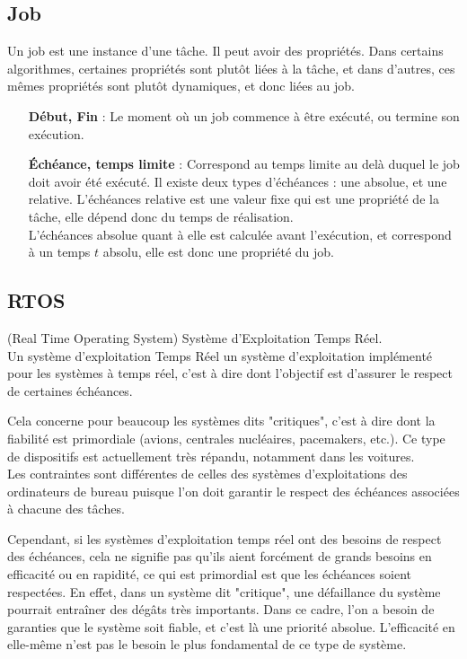 \documentclass[11pt,a4paper,oneside]{report}
\begin{document}
\subsection{Job}
Un job est une instance d'une tâche. 
Il peut avoir des propriétés. 
Dans certains algorithmes, certaines propriétés sont plutôt liées à la tâche, 
et dans d'autres, ces mêmes propriétés sont plutôt dynamiques, et donc liées au job.
\begin{itemize}
	\item[\textbf{Début, Fin}] : Le moment où un job commence à être exécuté, ou termine son exécution.
    \item[\textbf{Échéance, temps limite}] : Correspond au temps limite au delà duquel le job doit avoir été exécuté. Il existe deux types d'échéances : 
une absolue, et une relative. L'échéances relative est une valeur fixe qui 
est une propriété de la tâche, elle dépend donc du temps de réalisation.\\
L'échéances absolue quant à elle est calculée avant l'exécution, et correspond 
à un temps $t$ absolu, elle est donc une propriété du job.
\end{itemize}

\subsection{RTOS}
(Real Time Operating System) Système d'Exploitation Temps Réel.\\
Un système d'exploitation Temps Réel un système d'exploitation implémenté pour les systèmes 
à temps réel, c'est à dire dont l'objectif est d'assurer le respect de certaines échéances. 

Cela concerne pour beaucoup les systèmes dits "critiques", c'est à dire dont la fiabilité 
est primordiale (avions, centrales nucléaires, pacemakers, etc.). Ce type de dispositifs 
est actuellement très répandu, notamment dans les voitures.\\
Les contraintes sont différentes de celles des systèmes d'exploitations des ordinateurs 
de bureau puisque l'on doit garantir le respect des échéances associées à chacune des tâches. 

Cependant, si les systèmes d'exploitation temps réel ont des besoins de respect des échéances, 
cela ne signifie pas qu'ils aient forcément de grands besoins en efficacité ou en rapidité, ce qui 
est primordial est que les échéances soient respectées. 
En effet, dans un système dit "critique", une défaillance du système pourrait entraîner des dégâts 
très importants. 
Dans ce cadre, l'on a besoin de garanties que le système soit fiable, et c'est là une priorité absolue.
L'efficacité en elle-même n'est pas le besoin le plus fondamental de ce type de système.\\
\end{document}
